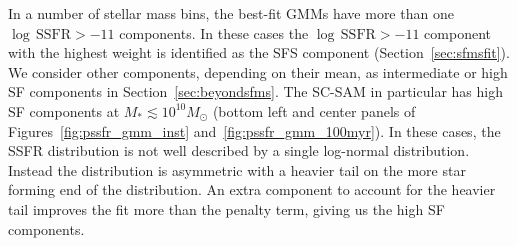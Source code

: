 \documentclass[tighten, preprint]{aastex62}
\begin{document}
{In a number of stellar mass bins, the best-fit GMMs have more than one 
$\log\,\mathrm{SSFR} > -11$ components. In these cases the 
$\log\,\mathrm{SSFR} > -11$ component with the highest weight is identified
as the SFS component (Section~\ref{sec:sfmsfit}). We consider other 
components, depending on their mean, as intermediate or high SF components in 
Section~\ref{sec:beyondsfms}. The SC-SAM in particular has high SF
components at $M_* \lesssim 10^{10}M_\odot$ (bottom left and center panels
of Figures~\ref{fig:pssfr_gmm_inst}  and~\ref{fig:pssfr_gmm_100myr}).
In these cases, the SSFR distribution is not well described by a single 
log-normal distribution. Instead the distribution is asymmetric with a 
heavier tail on the more star forming end of the distribution. An
extra component to account for the heavier tail improves the fit more 
than the penalty term, giving us the high SF components.}


\end{document}
